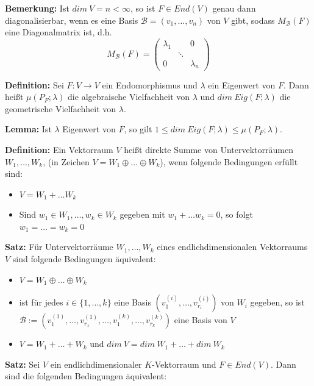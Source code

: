 \documentclass{article}
\begin{document}
\textbf{Bemerkung:} Ist $dim\ V=n<\infty$, so ist $F\in End(V)$ genau dann
diagonalisierbar, wenn es eine Basis $\mathcal{B}=(v_1,\dots,v_n)$ von $V$
gibt, sodass $M_\mathcal{B}(F)$ eine Diagonalmatrix ist, d.h.
\begin{equation*}
	M_\mathcal{B}(F)=
	\begin{pmatrix}
		\lambda_1 & & 0\\
		& \ddots & \\
		0 & & \lambda_n
	\end{pmatrix}
\end{equation*}

\textbf{Definition:} Sei $F:V\to V$ ein Endomorphismus und $\lambda$ ein
Eigenwert von $F$. Dann heißt $\mu(P_F;\lambda)$ die algebraische Vielfachheit
von $\lambda$ und $dim\ Eig(F;\lambda)$ die geometrische Vielfachheit von
$\lambda$.

\textbf{Lemma:} Ist $\lambda$ Eigenwert von $F$, so gilt $1\leq dim\
Eig(F;\lambda)\leq \mu(P_F;\lambda)$.

\textbf{Definition:} Ein Vektorraum $V$ heißt direkte Summe von
Untervektorräumen $W_1,\dots, W_k$, (in Zeichen $V=W_1\oplus\dots\oplus W_k$),
wenn folgende Bedingungen erfüllt sind:

\begin{itemize} 
\item[DS1] $V=W_1+\dots W_k$
\item[DS2] Sind $w_1\in W_1,\dots,w_k\in W_k$ gegeben mit $w_1+\dots w_k=0$, so
	folgt $w_1=\dots=w_k=0$
\end{itemize}

\textbf{Satz:} Für Untervektorräume $W_1,\dots,W_k$ eines endlichdimensionalen
Vektorraums $V$ sind folgende Bedingungen äquivalent:

\begin{itemize}
\item[i)] $V=W_1\oplus\dots\oplus W_k$

\item[ii)] ist für jedes $i\in\{1,\dots,k\}$ eine Basis $(v_1^{(i)},\dots,
	v_{r_i}^{(i)})$ von $W_i$ gegeben, so ist $\mathcal{B}:=(v_{1}^{(1)},
	\dots, v_{r_1}^{(1)},\dots , v_{1}^{(k)}, \dots , v_{r_k}^{(k)})$ eine
	Basis von $V$

\item[iii)] $V=W_1+\dots+W_k$ und $dim\ V=dim\ W_1+ \dots+dim\ W_k$
\end{itemize}

\newpage
\textbf{Satz:} Sei $V$ ein endlichdimensionaler $K$-Vektorraum und $F\in
End(V)$. Dann sind die folgenden Bedingungen äquivalent:
\end{document}
